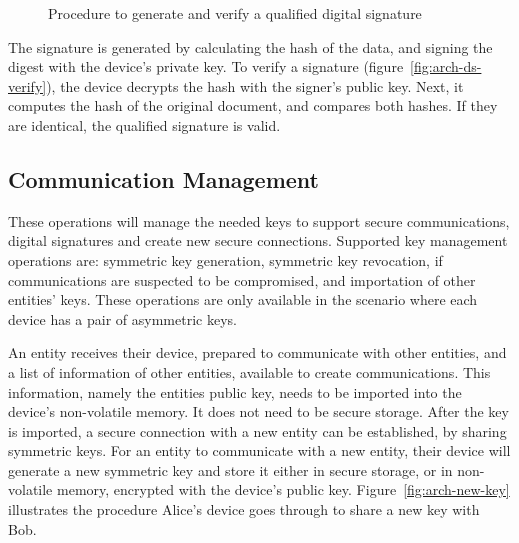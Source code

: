 \begin{figure}[h]
	\centering     %
	\caption{Procedure to generate and verify a qualified digital signature}
\end{figure}

The signature is generated by calculating the hash of the data, and signing the digest with the device's private key. To verify a signature (figure~\ref{fig:arch-ds-verify}), the device decrypts the hash with the signer's public key. Next, it computes the hash of the original document, and compares both hashes. If they are identical, the qualified signature is valid.

\subsection{Communication Management}\label{chap:arch:ops:key}

These operations will manage the needed keys to support secure communications, digital signatures and create new secure connections.
Supported key management operations are: symmetric key generation, symmetric key revocation, if communications are suspected to be compromised, and importation of other entities' keys.
These operations are only available in the scenario where each device has a pair of asymmetric keys.

An entity receives their device, prepared to communicate with other entities, and a list of information of other entities, available to create communications. This information, namely the entities public key, needs to be imported into the device's non-volatile memory. It does not need to be secure storage.
After the key is imported, a secure connection with a new entity can be established, by sharing symmetric keys.
For an entity to communicate with a new entity, their device will generate a new symmetric key and store it either in secure storage, or in non-volatile memory, encrypted with the device's public key. Figure~\ref{fig:arch-new-key} illustrates the procedure Alice's device goes through to share a new key with Bob.


